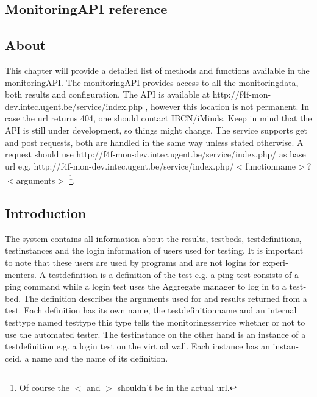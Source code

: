 \begin{otherlanguage}{english}
\chapter{MonitoringAPI reference}
\label{REFERENCE}
\section{About}
This chapter will provide a detailed list of methods and functions available in the monitoringAPI. The monitoringAPI provides access to all the monitoringdata, both results and configuration. The API is available at http://f4f-mon-dev.intec.ugent.be/service/index.php , however this location is not permanent. In case the url returns 404, one should contact IBCN/iMinds. Keep in mind that the API is still under development, so things might change.
\npar
The service supports get and post requests, both are handled in the same way unless stated otherwise. A request should use http://f4f-mon-dev.intec.ugent.be/service/index.php/ as base url e.g. http://f4f-mon-dev.intec.ugent.be/service/index.php/$<$functionname$>$?$<$arguments$>$ \footnote{Of course the $<$ and $>$ shouldn't be in the actual url.}. 

\section{Introduction}
The system contains all information about the results, testbeds, testdefinitions, testinstances and the login information of users used for testing. It is important to note that these users are used by programs and are not logins for experimenters.  
\npar
A testdefinition is a definition of the test e.g. a ping test consists of a ping command while a login test uses the Aggregate manager to log in to a testbed. The definition describes the arguments used for and results returned from a test. Each definition has its own name, the testdefinitionname and an internal testtype named testtype this type tells the monitoringsservice whether or not to use the automated tester.
\npar
The testinstance on the other hand is an instance of a testdefinition e.g. a login test on the virtual wall. Each instance has an instanceid, a name and the name of its definition.


\end{otherlanguage}
